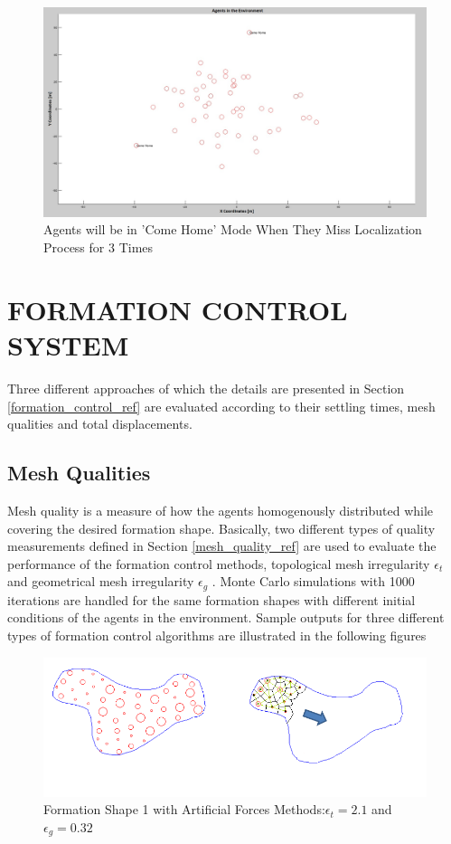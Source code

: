 \begin{figure}[H]
\captionsetup{format=hang,justification=centerfirst}
\caption{Agents will be in 'Come Home' Mode When They Miss Localization Process for 3 Times} \label{come_home_ref}
\centerline{\includegraphics[scale = 0.27]{Lost-2-3}}
\end{figure} 		
		
\section{FORMATION CONTROL SYSTEM}
Three different approaches of which the details are presented in Section \ref{formation_control_ref} are evaluated according to their settling times, mesh qualities and total displacements. 

\subsection{Mesh Qualities} 
Mesh quality is a measure of how the agents homogenously distributed while covering the desired formation shape. Basically, two different types of quality measurements defined in Section \ref{mesh_quality_ref} are used to evaluate the performance of the formation control methods, topological mesh irregularity $\epsilon_t$ and geometrical mesh irregularity $\epsilon_g$ . Monte Carlo simulations with 1000 iterations are handled for the same formation shapes with different initial conditions of the agents in the environment. Sample outputs for three different types of formation control algorithms are illustrated in the following figures
  
\begin{figure}[H]
\caption{Formation Shape 1 with Artificial Forces Methods:$\epsilon_t = 2.1$ and $\epsilon_g = 0.32$}
\centerline{\includegraphics[scale = 0.70]{Artificial_Forces_Mesh_1}}
\end{figure} 		
		
